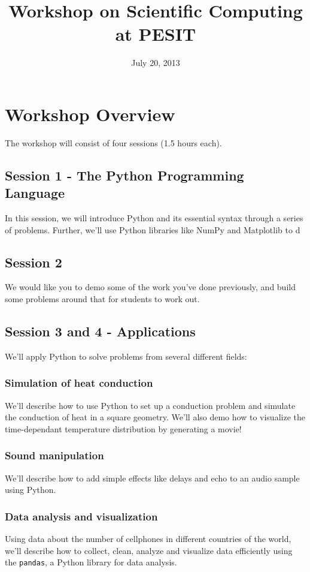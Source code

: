 \documentclass{article}
\begin{document}
\title{Workshop on Scientific Computing at PESIT}
\date{July 20, 2013}
\maketitle
\section*{Workshop Overview}
The workshop will consist of four sessions (1.5 hours each).
\subsection*{Session 1 - The Python Programming Language}
In this session, we will introduce Python and its essential syntax through
a series of problems. Further, we'll use Python libraries like NumPy and Matplotlib
to d

\subsection*{Session 2}
We would like you to demo some of the work you've done previously, and build
some problems around that for students to work out.
\subsection*{Session 3 and 4 - Applications}
We'll apply Python to solve problems from several different fields:
\subsubsection*{Simulation of heat conduction}
We'll describe how to use Python to set up a conduction problem and simulate
the conduction of heat in a square geometry. We'll also demo how to visualize
the time-dependant temperature distribution by generating a movie!
\subsubsection*{Sound manipulation}
We'll describe how to add simple effects like delays and echo to an audio sample
using Python.
\subsubsection*{Data analysis and visualization}
Using data about the number of cellphones in different countries of the world, 
we'll describe how to collect, clean, analyze and visualize data efficiently
using the \texttt{pandas}, a Python library for data analysis.
\end{document}
